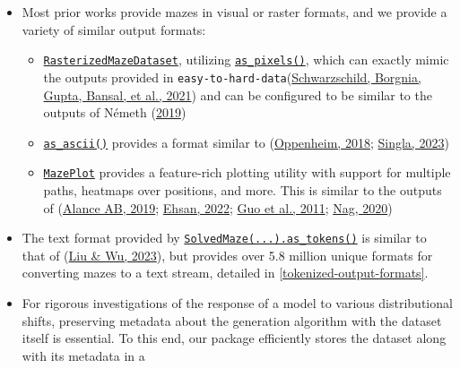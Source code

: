 \documentclass[10pt,a4paper,onecolumn]{article}
\providecommand{\tightlist}{%
  \setlength{\itemsep}{0pt}\setlength{\parskip}{0pt}}
\begin{document}
\begin{itemize}
\item
  Most prior works provide mazes in visual or raster formats, and we
  provide a variety of similar output formats:

  \begin{itemize}
  \tightlist
  \item
    \href{https://understanding-search.github.io/maze-dataset/maze_dataset/dataset/rasterized.html\#RasterizedMazeDataset}{\texttt{RasterizedMazeDataset}},
    utilizing
    \href{https://understanding-search.github.io/maze-dataset/maze_dataset.html\#LatticeMaze.as_pixels}{\texttt{as\_pixels()}},
    which can exactly mimic the outputs provided in
    \texttt{easy-to-hard-data}(\protect\hyperlink{ref-easy_to_hard}{Schwarzschild,
    Borgnia, Gupta, Bansal, et al., 2021}) and can be configured to be
    similar to the outputs of Németh
    (\protect\hyperlink{ref-gh_Nemeth_2019}{2019})
  \item
    \href{https://understanding-search.github.io/maze-dataset/maze_dataset.html\#LatticeMaze.as_ascii}{\texttt{as\_ascii()}}
    provides a format similar to
    (\protect\hyperlink{ref-gh-oppenheimj2018maze}{Oppenheim, 2018};
    \protect\hyperlink{ref-eval-gpt-visual}{Singla, 2023})
  \item
    \href{https://understanding-search.github.io/maze-dataset/maze_dataset/plotting.html\#MazePlot}{\texttt{MazePlot}}
    provides a feature-rich plotting utility with support for multiple
    paths, heatmaps over positions, and more. This is similar to the
    outputs of (\protect\hyperlink{ref-mazegenerator-net}{Alance AB,
    2019}; \protect\hyperlink{ref-gh_Ehsan_2022}{Ehsan, 2022};
    \protect\hyperlink{ref-mathematica-maze}{Guo et al., 2011};
    \protect\hyperlink{ref-mdl-suite}{Nag, 2020})
  \end{itemize}
\item
  The text format provided by
  \href{https://understanding-search.github.io/maze-dataset/maze_dataset.html\#MazeDataset.as_tokens}{\texttt{SolvedMaze(...).as\_tokens()}}
  is similar to that of (\protect\hyperlink{ref-eval-LLM-graphs}{Liu \&
  Wu, 2023}), but provides over 5.8 million unique formats for
  converting mazes to a text stream, detailed in
  \autoref{tokenized-output-formats}.
\item
  For rigorous investigations of the response of a model to various
  distributional shifts, preserving metadata about the generation
  algorithm with the dataset itself is essential. To this end, our
  package efficiently stores the dataset along with its metadata in a

\end{itemize}
\end{document}
